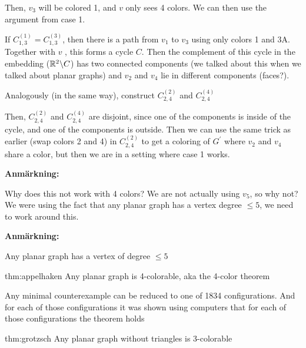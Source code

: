 \begin{prf}
\begin{itemize}
      \noindent Then, $v_3$ will be colored 1, and $v$ only sees 4 colors. We can then use the argument from case 1. 
      \par\bigskip
      \noindent If $C_{1,3}^{(1)} = C_{1,3}^{(3)}$, then there is a path from $v_1$ to $v_3$ using only colors 1 and 3A. Together with $v$ , this forms a cycle $C$. Then the complement of this cycle in the embedding ($\mathbb{R}^2\backslash C$) has two connected components (we talked about this when we talked about planar graphs) and $v_2$ and $v_4$ lie in different components (faces?).
      \par\bigskip
      \noindent Analogously (in the same way), construct $C_{2,4}^{(2)}$ and $C_{2,4}^{(4)}$\par
      \noindent Then, $C_{2,4}^{(2)}$ and $C_{2,4}^{(4)}$ are disjoint, since one of the components is inside of the cycle, and one of the components is outside. Then we can use the same trick as earlier (swap colors 2 and 4) in $C_{2,4}^{(2)}$ to get a coloring of $G^{\prime}$  where $v_2$ and $v_4$ share a color, but then we are in a setting where case 1 works. 
  \end{itemize}
\end{prf}
\par\bigskip
\noindent\textbf{Anmärkning:}\par
\noindent Why does this not work with 4 colors? We are not actually using $v_5$, so why not? We were using the fact that any planar graph has a vertex degree $\leq 5$, we need to work around this.
\par\bigskip
\noindent\textbf{Anmärkning:}\par
\noindent Any planar graph has a vertex of degree $\leq5$
\par\bigskip
\begin{theo}{thm:appelhaken}
  Any planar graph is 4-colorable, aka the 4-color theorem
\end{theo}
\par\bigskip
\noindent Any minimal counterexample can be reduced to one of 1834 configurations. And for each of those configurations it was shown using computers that for each of those configurations the theorem holds
\par\bigskip
\begin{theo}[Grötzsch]{thm:grotzsch}
  Any planar graph without triangles is 3-colorable
\end{theo}
\par\bigskip
